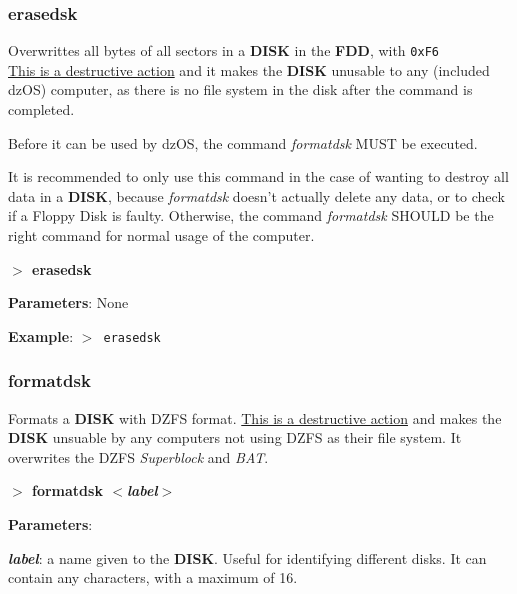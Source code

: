 \documentclass[a4paper,11pt]{article}
\begin{document}
        \subsubsection{{\color{blue}erasedsk}}
        Overwrittes all bytes of all sectors in a \textbf{DISK} in the
        \textbf{FDD}, with \texttt{0xF6} \\

        \underline{This is a destructive action} and it makes the \textbf{DISK}
        unusable to any (included dzOS) computer, as there is no file system in
        the disk after the command is completed.
        
        Before it can be used by dzOS, the command \textit{formatdsk} MUST be
        executed.

        It is recommended to only use this command in the case of wanting to
        destroy all data in a \textbf{DISK}, because \textit{formatdsk} doesn't
        actually delete any data, or to check if a Floppy Disk is faulty.
        Otherwise, the command \textit{formatdsk} SHOULD be the right command
        for normal usage of the computer.

        \hspace{1.9cm}\textbf{$>$ erasedsk}

        \textbf{Parameters}: None

        \textbf{Example}: \texttt{$>$ erasedsk}

        \subsubsection{{\color{blue}formatdsk}}
        Formats a \textbf{DISK} with DZFS format. \underline{This is a
        destructive action} and makes the \textbf{DISK} unsuable by any
        computers not using DZFS as their file system. It overwrites the DZFS
        \textit{Superblock} and \textit{BAT}.

        \hspace{1.9cm}\textbf{$>$ formatdsk \textit{$<$label$>$}}

        \textbf{Parameters}:

        \hspace{1cm}\textbf{\textit{label}}: a name given to the \textbf{DISK}.
        Useful for identifying different disks. It can contain any characters,
        with a maximum of 16.
\end{document}
